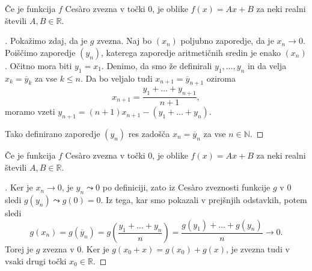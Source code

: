 \documentclass[10pt,hyperref={unicode}]{beamer}
\newenvironment{dokaz}{\begin{proof}[\bfseries\upshape\proofname]}{\end{proof}}
\begin{document}
\begin{frame}
    \begin{block}{}
        Če je funkcija $f$ Ces\`{a}ro zvezna v točki $0$, je oblike $f(x) = Ax + B$ za neki realni števili $A, B \in \mathbb{R}$.
    \end{block}
    \begin{dokaz}\renewcommand{\qedsymbol}{}
        Pokažimo zdaj, da je $g$ zvezna. Naj bo $(x_n)$ poljubno zaporedje, da je $x_n \rightarrow 0$. Poiščimo zaporedje $(y_n)$, katerega zaporedje aritmetičnih sredin je enako $(x_n)$. 
        \pause
        Očitno mora biti $y_1 = x_1$. Denimo, da smo že definirali $y_1, \ldots, y_n$ in da velja $x_k = \overline{y}_k$ za vse $k \leq n$. Da bo veljalo tudi $x_{n+1} = \overline{y}_{n+1}$ oziroma 
        $$x_{n+1} = \frac{y_1 + \ldots + y_{n+1}}{n+1},$$ 
        moramo vzeti $y_{n+1} = (n+1)x_{n+1} - (y_1 + \ldots + y_n)$. 
        \pause
        
        Tako definirano zaporedje $(y_n)$ res zadošča $x_n = \overline{y}_n$ za vse $n \in \mathbb{N}$.
    \end{dokaz}
\end{frame}

\begin{frame}
    \begin{block}{}
        Če je funkcija $f$ Ces\`{a}ro zvezna v točki $0$, je oblike $f(x) = Ax + B$ za neki realni števili $A, B \in \mathbb{R}$.
    \end{block}
    \begin{dokaz}\renewcommand{\qedsymbol}{}
        Ker je $x_n \rightarrow 0$, je $y_n \leadsto 0$ po definiciji, zato iz Ces\`{a}ro zveznosti funkcije $g$ v $0$ sledi $g(y_n) \leadsto g(0) = 0$. 
        \pause
        Iz tega, kar smo pokazali v prejšnjih odstavkih, potem sledi 
        $$g(x_n) = g(\overline{y}_n) = g\left( \frac{y_1 + \ldots + y_n}{n} \right) = \frac{g(y_1) + \ldots + g(y_n)}{n} \rightarrow 0.$$
        Torej je $g$ zvezna v $0$. 
        \pause
        Ker je $g(x_0 + x) = g(x_0) + g(x)$, je zvezna tudi v vsaki drugi točki $x_0 \in \mathbb{R}$.
    \end{dokaz}
\end{frame}
\end{document}
